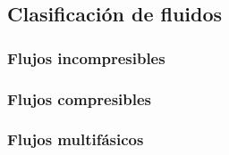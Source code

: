 
\subsection{Clasificación de fluidos}
	\subsubsection{Flujos incompresibles}
	\subsubsection{Flujos compresibles}
	\subsubsection{Flujos multifásicos}
	